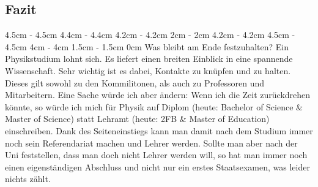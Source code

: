 \begin{multicols*}{2}
\subsection[Fazit]{\hspace{4.5cm}Fazit}
4.5cm \dimexpr\columnwidth - 4.5cm
4.4cm \dimexpr\columnwidth - 4.4cm
4.2cm \dimexpr\columnwidth - 4.2cm
2cm \dimexpr\columnwidth - 2cm
4.2cm \dimexpr\columnwidth - 4.2cm
4.5cm \dimexpr\columnwidth - 4.5cm
4cm \dimexpr\columnwidth - 4cm
1.5cm \dimexpr\columnwidth - 1.5cm
0cm \columnwidth
Was bleibt am Ende festzuhalten?
Ein Physikstudium lohnt sich.
Es liefert einen breiten Einblick in eine spannende Wissenschaft.
Sehr wichtig ist es dabei, Kontakte zu knüpfen und zu halten.
Dieses gilt sowohl zu den Kommilitonen, als auch zu Professoren und Mitarbeitern.
Eine Sache würde ich aber ändern:
Wenn ich die Zeit zurückdrehen könnte, so würde ich mich für Physik auf Diplom (heute: Bachelor of Science \& Master of Science) statt Lehramt (heute: 2FB \& Master of Education) einschreiben.
Dank des Seiteneinstiegs kann man damit nach dem Studium immer noch sein Referendariat machen und Lehrer werden.
Sollte man aber nach der Uni feststellen, dass man doch nicht Lehrer werden will, so hat man immer noch einen eigenständigen Abschluss und nicht nur ein erstes Staatsexamen, was leider nichts zählt.

\begin{center}
	\Large{}
\end{center}

\end{multicols*}
